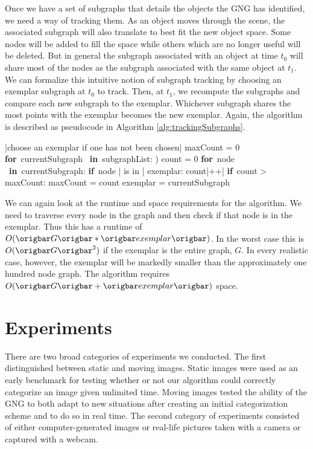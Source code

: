 \documentclass{article}
\renewcommand{\|}{\origbar} %
\renewcommand{\FOR}{\mbox{{\bf for} }\tab}
\renewcommand{\IF}{\mbox{{\bf if} }\tab}
\newcommand{\IN}{\mbox{ {\bf in} }}
\begin{document}
Once we have a set of subgraphs that details the objects the GNG has identified, we need a way of tracking them. As an object moves through the scene, the associated subgraph will also translate to best fit the new object space. Some nodes will be added to fill the space while others which are no longer useful will be deleted. But in general the subgraph associated with an object at time $t_0$ will share most of the nodes as the subgraph associated with the same object at $t_1$. We can formalize this intuitive notion of subgraph tracking by choosing an exemplar subgraph at $t_0$ to track. Then, at $t_1$, we recompute the subgraphs and compare each new subgraph to the exemplar. Whichever subgraph shares the most points with the exemplar becomes the new exemplar. Again, the algorithm is described as pseudocode in Algorithm \ref{alg:trackingSubgraphs}.

\begin{Algorithm}[h!]
\begin{program}
  |choose an exemplar if one has not been chosen|
  maxCount = 0
  \FOR currentSubgraph \IN subgraphList: )
    count = 0
    \FOR node \IN currentSubgraph:
      \IF node | is in | exemplar:
        count|++| \untab \untab
    \IF count > maxCount:
      maxCount = count
      exemplar = currentSubgraph
\end{program}
\caption{Pseudocode for Tracking Subgraphs}
\label{alg:trackingSubgraphs}
\end{Algorithm}

We can again look at the runtime and space requirements for the algorithm. We need to traverse every node in the graph and then check if that node is in the exemplar. Thus this has a runtime of $O(\|G\|*\|exemplar\|)$. In the worst case this is $O(\|G\|^2)$ if the exemplar is the entire graph, $G$. In every realistic case, however, the exemplar will be markedly smaller than the approximately one hundred node graph. The algorithm requires $O(\|G\|+\|exemplar\|)$ space.

\section{Experiments}
\label{sec:experiments}

There are two broad categories of experiments we conducted. The first distinguished between static and moving images. Static images were used as an early benchmark for testing whether or not our algorithm could correctly categorize an image given unlimited time. Moving images tested the ability of the GNG to both adapt to new situations after creating an initial categorization scheme and to do so in real time. The second category of experiments consisted of either computer-generated images or real-life pictures taken with a camera or captured with a webcam. 
\end{document}
